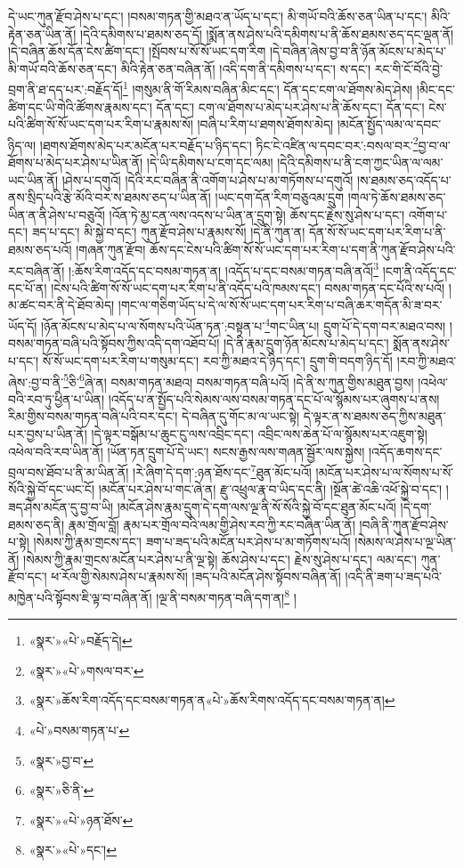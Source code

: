 དེ་ཡང་ཀུན་རྫོབ་ཤེས་པ་དང་། །བསམ་གཏན་གྱི་མཐའ་ན་ཡོད་པ་དང་། མི་གཡོ་བའི་ཆོས་ཅན་ཡིན་པ་དང་། མིའི་རྟེན་ཅན་ཡིན་ནོ། །དེའི་དམིགས་པ་ཐམས་ཅད་དོ། །སྨོན་ནས་ཤེས་པའི་དམིགས་པ་ནི་ཆོས་ཐམས་ཅད་དང་ལྡན་ནོ། །དེ་བཞིན་ཆོས་དོན་ངེས་ཚིག་དང་། །སྤོབས་པ་སོ་སོ་ཡང་དག་རིག །དེ་བཞིན་ཞེས་བྱ་བ་ནི་ཉོན་མོངས་པ་མེད་པ་མི་གཡོ་བའི་ཆོས་ཅན་དང་། མིའི་རྟེན་ཅན་བཞིན་ནོ། །འདི་དག་ནི་དམིགས་པ་དང་། ས་དང་། རང་གི་ངོ་བོའི་བྱེ་བྲག་ནི་ཐ་དད་པར་:བརྗོད་དོ།\footnote{«སྣར་»«པེ་»བརྗོད་དེ།} །གསུམ་ནི་གོ་རིམས་བཞིན་མིང་དང་། དོན་དང་ངག་ལ་ཐོགས་མེད་ཤེས། །མིང་དང་ཚིག་དང་ཡི་གེའི་ཚོགས་རྣམས་དང་། དོན་དང་། ངག་ལ་ཐོགས་པ་མེད་པར་ཤེས་པ་ནི་ཆོས་དང་། དོན་དང་། ངེས་པའི་ཚིག་སོ་སོ་ཡང་དག་པར་རིག་པ་རྣམས་སོ། །བཞི་པ་རིག་པ་ཐགས་ཐོགས་མེད། །མངོན་སྤྱོད་ལམ་ལ་དབང་ཉིད་ལ། །ཐགས་ཐོགས་མེད་པར་མངོན་པར་བརྗོད་པ་ཉིད་དང་། ཏིང་ངེ་འཛིན་ལ་དབང་བར་:བསལ་བར་\footnote{«སྣར་»«པེ་»གསལ་བར་}བྱ་བ་ལ་ཐོགས་པ་མེད་པར་ཤེས་པ་ཡིན་ནོ། །དེ་ཡི་དམིགས་པ་ངག་དང་ལམ། །དེའི་དམིགས་པ་ནི་ངག་ཀྱང་ཡིན་ལ་ལམ་ཡང་ཡིན་ནོ། །ཤེས་པ་དགུའོ། །དེའི་རང་བཞིན་ནི་འགོག་པ་ཤེས་པ་མ་གཏོགས་པ་དགུའོ། །ས་ཐམས་ཅད་འདོད་པ་ནས་སྲིད་པའི་རྩེ་མོའི་བར་ས་ཐམས་ཅད་པ་ཡིན་ནོ། །ཡང་དག་དོན་རིག་བཅུའམ་དྲུག །གལ་ཏེ་ཆོས་ཐམས་ཅད་ཡིན་ན་ནི་ཤེས་པ་བཅུའོ། །འོན་ཏེ་མྱ་ངན་ལས་འདས་པ་ཡིན་ན་དྲུག་སྟེ། ཆོས་དང་རྗེས་སུ་ཤེས་པ་དང་། འགོག་པ་དང་། ཟད་པ་དང་། མི་སྐྱེ་བ་དང་། ཀུན་རྫོབ་ཤེས་པ་རྣམས་སོ། །དེ་ནི་ཀུན་ན། དོན་སོ་སོ་ཡང་དག་པར་རིག་པ་ནི་ཐམས་ཅད་པའོ། །གཞན་ཀུན་རྫོབ། ཆོས་དང་ངེས་པའི་ཚིག་སོ་སོ་ཡང་དག་པར་རིག་པ་དག་ནི་ཀུན་རྫོབ་ཤེས་པའི་རང་བཞིན་ནོ། །:ཆོས་རིག་འདོད་དང་བསམ་གཏན་ན། །འདོད་པ་དང་བསམ་གཏན་བཞི་ནའོ།\footnote{«སྣར་»ཆོས་རིག་འདོད་དང་བསམ་གཏན་ན«པེ་»ཆོས་རིགས་འདོད་དང་བསམ་གཏན་ན།} །ངག་ནི་འདོད་དང་དང་པོ་ན། །ངེས་པའི་ཚིག་སོ་སོ་ཡང་དག་པར་རིག་པ་ནི་འདོད་པའི་ཁམས་དང་། བསམ་གཏན་དང་པོའི་ས་པའོ། །མ་ཚང་བར་ནི་དེ་ཐོབ་མེད། །གང་ལ་གཅིག་ཡོད་པ་དེ་ལ་སོ་སོ་ཡང་དག་པར་རིག་པ་བཞི་ཆར་གདོན་མི་ཟ་བར་ཡོད་དོ། །ཉོན་མོངས་པ་མེད་པ་ལ་སོགས་པའི་ཡོན་ཏན་:བསྟན་པ་\footnote{«པེ་»བསམ་གཏན་པ་}གང་ཡིན་པ། དྲུག་པོ་དེ་དག་བར་མཐའ་བས། །བསམ་གཏན་བཞི་པའི་སྟོབས་ཀྱིས་འདི་དག་འཐོབ་པོ། །དེ་ནི་རྣམ་དྲུག་ཉོན་མོངས་པ་མེད་པ་དང་། སྨོན་ནས་ཤེས་པ་དང་། སོ་སོ་ཡང་དག་པར་རིག་པ་གསུམ་དང་། རབ་ཀྱི་མཐའ་དེ་ཉིད་དང་། དྲུག་གི་བདག་ཉིད་དོ། །རབ་ཀྱི་མཐའ་ཞེས་:བྱ་བ་ནི་\footnote{«སྣར་»བྱ་བ་}ཅི་\footnote{«སྣར་»ཅི་ནི་}ཞེ་ན། བསམ་གཏན་མཐའ། བསམ་གཏན་བཞི་པའོ། །དེ་ནི་ས་ཀུན་གྱིས་མཐུན་བྱས། །འཕེལ་བའི་རབ་ཏུ་ཕྱིན་པ་ཡིན། །འདོད་པ་ན་སྤྱོད་པའི་སེམས་ལས་བསམ་གཏན་དང་པོ་ལ་སྙོམས་པར་ཞུགས་པ་ནས། རིམ་གྱིས་བསམ་གཏན་བཞི་པའི་བར་དང་། དེ་བཞིན་དུ་གོང་མ་ལ་ཡང་སྟེ། དེ་ལྟར་ན་ས་ཐམས་ཅད་ཀྱིས་མཐུན་པར་བྱས་པ་ཡིན་ནོ། །དེ་ལྟར་བསྒོམ་པ་ཆུང་ངུ་ལས་འབྲིང་དང་། འབྲིང་ལས་ཆེན་པོ་ལ་སྙོམས་པར་འཇུག་སྟེ། འཕེལ་བའི་རབ་ཡིན་ནོ། །ཡོན་ཏན་དྲུག་པོ་དེ་ཡང་། སངས་རྒྱས་ལས་གཞན་སྦྱོར་ལས་སྐྱེས། །འདོད་ཆགས་དང་བྲལ་བས་ཐོབ་པ་ནི་མ་ཡིན་ནོ། །རེ་ཞིག་དེ་དག་:ཉན་ཐོས་དང་\footnote{«སྣར་»«པེ་»ཉན་ཐོས་}ཐུན་མོང་པའོ། །མངོན་པར་ཤེས་པ་ལ་སོགས་པ་སོ་སོའི་སྐྱེ་བོ་དང་ཡང་ངོ། །མངོན་པར་ཤེས་པ་གང་ཞེ་ན། རྫུ་འཕྲུལ་རྣ་བ་ཡིད་དང་ནི། །སྔོན་ཚེ་འཆི་འཕོ་སྐྱེ་བ་དང་། །ཟད་ཤེས་མངོན་དུ་བྱ་བ་ཡི། །མངོན་ཤེས་རྣམ་དྲུག་དེ་དག་ལས་ལྔ་ནི་སོ་སོའི་སྐྱེ་བོ་དང་ཐུན་མོང་པའོ། །དེ་དག་ཐམས་ཅད་ནི། རྣམ་གྲོལ་བློ། རྣམ་པར་གྲོལ་བའི་ལམ་གྱི་ཤེས་རབ་ཀྱི་རང་བཞིན་ཡིན་ནོ། །བཞི་ནི་ཀུན་རྫོབ་ཤེས་པ་སྟེ། །སེམས་ཀྱི་རྣམ་གྲངས་དང་། ཟག་པ་ཟད་པའི་མངོན་པར་ཤེས་པ་མ་གཏོགས་པའོ། །སེམས་ལ་ཤེས་པ་ལྔ་ཡིན་ནོ། །སེམས་ཀྱི་རྣམ་གྲངས་མངོན་པར་ཤེས་པ་ནི་ལྔ་སྟེ། ཆོས་ཤེས་པ་དང་། རྗེས་སུ་ཤེས་པ་དང་། ལམ་དང་། ཀུན་རྫོབ་དང་། ཕ་རོལ་གྱི་སེམས་ཤེས་པ་རྣམས་སོ། །ཟད་པའི་མངོན་ཤེས་སྟོབས་བཞིན་ནོ། །འདི་ནི་ཟག་པ་ཟད་པའི་མཁྱེན་པའི་སྟོབས་ཇི་ལྟ་བ་བཞིན་ནོ། །ལྔ་ནི་བསམ་གཏན་བཞི་དག་ན།\footnote{«སྣར་»«པེ་»དང་།} །

